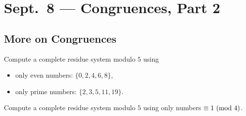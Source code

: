 \chapter{Sept.~8 --- Congruences, Part 2}

\section{More on Congruences}
\begin{example}
  Compute a complete residue system
  modulo $5$ using
  \begin{itemize}
    \item only even numbers:
      $\{0, 2, 4, 6, 8\}$,
    \item only prime numbers:
      $\{2, 3, 5, 11, 19\}$.
  \end{itemize}
\end{example}

\begin{example}
  Compute a complete residue system
  modulo $5$ using only numbers
  $\equiv 1 \ (\mathrm{mod}\ 4)$.
\end{example}

